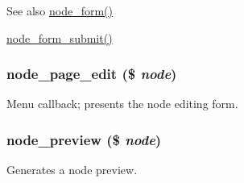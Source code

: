 \begin{DoxySeeAlso}{See also}
\hyperlink{group__forms_ga267299500e205db099ee4e8396769d3f}{node\_\-form()} 

\hyperlink{node_8pages_8inc_addb125e26be73cec8769d2e729d7aa2c}{node\_\-form\_\-submit()} 
\end{DoxySeeAlso}
\hypertarget{node_8pages_8inc_a553fc35bb17545341a3fcc36360fb43b}{
\subsubsection[{node\_\-page\_\-edit}]{\setlength{\rightskip}{0pt plus 5cm}node\_\-page\_\-edit (\$ {\em node})}}
\label{node_8pages_8inc_a553fc35bb17545341a3fcc36360fb43b}
Menu callback; presents the node editing form. \hypertarget{node_8pages_8inc_a774d9df7be341a7c9058555e8cfb4b2b}{
\subsubsection[{node\_\-preview}]{\setlength{\rightskip}{0pt plus 5cm}node\_\-preview (\$ {\em node})}}
\label{node_8pages_8inc_a774d9df7be341a7c9058555e8cfb4b2b}
Generates a node preview.


